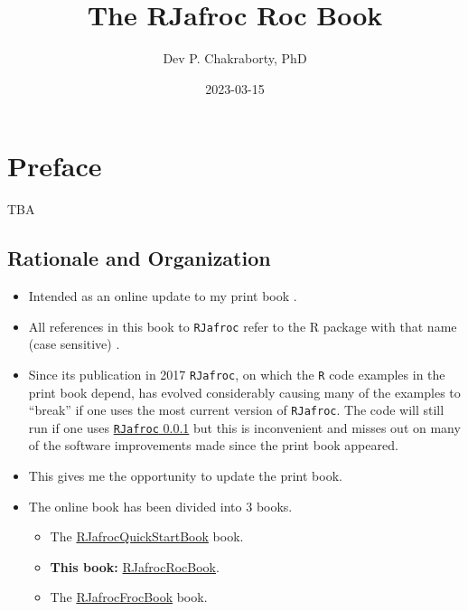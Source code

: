 \documentclass[
]{book}
\title{The RJafroc Roc Book}
\author{Dev P. Chakraborty, PhD}
\date{2023-03-15}
\providecommand{\tightlist}{%
  \setlength{\itemsep}{0pt}\setlength{\parskip}{0pt}}
\begin{document}
\maketitle

{
\setcounter{tocdepth}{1}
\tableofcontents
}
\hypertarget{preface}{%
\chapter*{Preface}\label{preface}}

TBA

\hypertarget{rationale-and-organization}{%
\section{Rationale and Organization}\label{rationale-and-organization}}

\begin{itemize}
\tightlist
\item
  Intended as an online update to my print book \citep{chakraborty2017observer}.
\item
  All references in this book to \texttt{RJafroc} refer to the R package with that name (case sensitive) \citep{R-RJafroc}.
\item
  Since its publication in 2017 \texttt{RJafroc}, on which the \texttt{R} code examples in the print book depend, has evolved considerably causing many of the examples to ``break'' if one uses the most current version of \texttt{RJafroc}. The code will still run if one uses \href{https://cran.r-project.org/src/contrib/Archive/RJafroc/}{\texttt{RJafroc} 0.0.1} but this is inconvenient and misses out on many of the software improvements made since the print book appeared.
\item
  This gives me the opportunity to update the print book.
\item
  The online book has been divided into 3 books.

  \begin{itemize}
  \tightlist
  \item
    The \href{https://dpc10ster.github.io/RJafrocQuickStart/}{RJafrocQuickStartBook} book.
  \item
    \textbf{This book:} \href{https://dpc10ster.github.io/RJafrocRocBook/}{RJafrocRocBook}.
  \item
    The \href{https://dpc10ster.github.io/RJafrocFrocBook/}{RJafrocFrocBook} book.
  \end{itemize}
\end{itemize}
\end{document}
